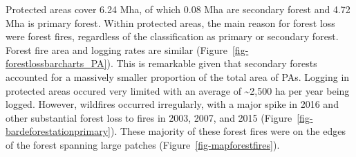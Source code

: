 \documentclass[
  letterpaper,
  DIV=11,
  numbers=noendperiod]{scrreprt}
\begin{document}
Protected areas cover 6.24 Mha, of which 0.08 Mha are secondary forest
and 4.72 Mha is primary forest. Within protected areas, the main reason
for forest loss were forest fires, regardless of the classification as
primary or secondary forest. Forest fire area and logging rates are
similar (Figure~\ref{fig-forestlossbarcharts_PA}). This is remarkable
given that secondary forests accounted for a massively smaller
proportion of the total area of PAs. Logging in protected areas occured
very limited with an average of \textasciitilde2,500 ha per year being
logged. However, wildfires occurred irregularly, with a major spike in
2016 and other substantial forest loss to fires in 2003, 2007, and 2015
(Figure~\ref{fig-bardeforestationprimary}). These majority of these
forest fires were on the edges of the forest spanning large patches
(Figure~\ref{fig-mapforestfires}).
\end{document}
